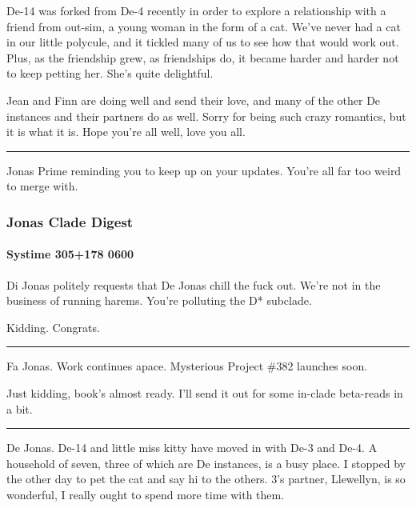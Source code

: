 De-14 was forked from De-4 recently in order to explore a relationship with a friend from out-sim, a young woman in the form of a cat. We've never had a cat in our little polycule, and it tickled many of us to see how that would work out. Plus, as the friendship grew, as friendships do, it became harder and harder not to keep petting her. She's quite delightful.

Jean and Finn are doing well and send their love, and many of the other De instances and their partners do as well. Sorry for being such crazy romantics, but it is what it is. Hope you're all well, love you all.

\begin{center}\rule{0.5\linewidth}{\linethickness}\end{center}

Jonas Prime reminding you to keep up on your updates. You're all far too weird to merge with.

\hypertarget{jonas-clade-digest-1}{%
\subsubsection{Jonas Clade Digest}\label{jonas-clade-digest-1}}

\hypertarget{systime-305178-0600}{%
\paragraph{Systime 305+178 0600}\label{systime-305178-0600}}

Di Jonas politely requests that De Jonas chill the fuck out. We're not in the business of running harems. You're polluting the D* subclade.

Kidding. Congrats.

\begin{center}\rule{0.5\linewidth}{\linethickness}\end{center}

Fa Jonas. Work continues apace. Mysterious Project \#382 launches soon.

Just kidding, book's almost ready. I'll send it out for some in-clade beta-reads in a bit.

\begin{center}\rule{0.5\linewidth}{\linethickness}\end{center}

De Jonas. De-14 and little miss kitty have moved in with De-3 and De-4. A household of seven, three of which are De instances, is a busy place. I stopped by the other day to pet the cat and say hi to the others. 3's partner, Llewellyn, is so wonderful, I really ought to spend more time with them.


